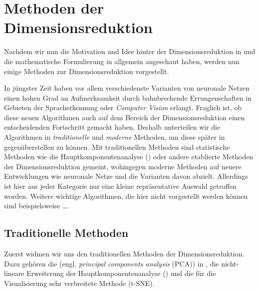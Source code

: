 \chapter{Methoden der Dimensionsreduktion}
\label{ch:MethodenDerDimRed}

Nachdem wir nun die Motivation und Idee hinter der Dimensionsreduktion in  und die mathematische Formulierung
in  allgemein angeschaut haben,
werden nun einige Methoden zur Dimensionsreduktion vorgestellt.

In jüngster Zeit haben vor allem verschiedenste Varianten von neuronale Netzen einen hohen Grad an Aufmerksamkeit durch bahnbrechende Errungenschaften in Gebieten der Spracherkennung oder \textit{Computer Vision} erlangt. Fraglich ist, ob diese neuen Algorithmen auch auf dem Bereich der Dimensionsreduktion einen entscheidenden Fortschritt gemacht haben. Deshalb unterteilen wir die Algorithmen in \textit{traditionelle}
und \textit{moderne} Methoden, um diese später in  gegenüberstellen zu können. Mit traditionellen Methoden
sind statistische Methoden wie die Hauptkomponentenanalyse () oder andere etablierte
Methoden der Dimensionsreduktion gemeint, wohingegen moderne Methoden auf neuere Entwicklungen wie neuronale Netze und die Varianten davon abzielt. Allerdings ist hier aus jeder Kategorie nur eine kleine repräsentative Auswahl getroffen worden. Weitere wichtige Algorithmen, die hier nicht vorgestellt werden können sind beispielsweise \dots {}.

\section{Traditionelle Methoden}
\label{ch:MethodenDerDimRed:traditionell}

Zuerst widmen wir uns den traditionellen Methoden der Dimensionsreduktion.
Dazu gehören die  (engl. \textit{principal components analysis} (PCA)) in ,
die nicht-lineare Erweiterung der
Hauptkomponentenanalyse ()
und die für die Visualisierung sehr verbreitete Methode  (t-SNE).


\newpage

